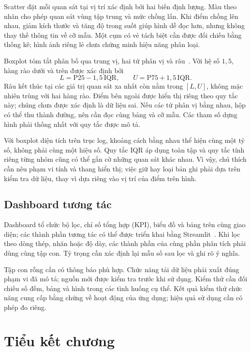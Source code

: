 \documentclass[12pt,a4paper,oneside]{report}
\begin{document}
Scatter đặt mỗi quan sát tại vị trí xác định bởi hai biến định lượng. Màu theo nhãn cho phép quan sát vùng tập trung và mức chồng lấn. Khi điểm chồng lên nhau, giảm kích thước và tăng độ trong suốt giúp hình dễ đọc hơn, nhưng không thay thế thông tin về cỡ mẫu. Một cụm có vẻ tách biệt cần được đối chiếu bằng thống kê; hình ảnh riêng lẻ chưa chứng minh hiệu năng phân loại.

Boxplot tóm tắt phân bố qua trung vị, hai tứ phân vị và râu~\cite{nistbox}. Với hệ số $1{,}5$, hàng rào dưới và trên được xác định bởi
\begin{equation}
  L=\mathrm{P25}-1{,}5\,\mathrm{IQR},
  \qquad
  U=\mathrm{P75}+1{,}5\,\mathrm{IQR}.
  \label{eq:hangraoiqr}
\end{equation}
Râu kết thúc tại các giá trị quan sát xa nhất còn nằm trong $[L,U]$, không mặc nhiên trùng với hai hàng rào. Điểm bên ngoài được hiển thị riêng theo quy tắc này; chúng chưa được xác định là dữ liệu sai. Nếu các tứ phân vị bằng nhau, hộp có thể thu thành đường, nên cần đọc cùng bảng và cỡ mẫu. Các tham số dựng hình phải thống nhất với quy tắc được mô tả.

Với boxplot diện tích trên trục log, khoảng cách bằng nhau thể hiện cùng một tỷ số, không phải cùng một hiệu số. Quy tắc IQR áp dụng toàn tập và quy tắc tính riêng từng nhóm cũng có thể gắn cờ những quan sát khác nhau. Vì vậy, chú thích cần nêu phạm vi tính và thang hiển thị; việc giữ hay loại bản ghi phải dựa trên kiểm tra dữ liệu, thay vì dựa riêng vào vị trí của điểm trên hình.

\subsection{Dashboard tương tác}

Dashboard tổ chức bộ lọc, chỉ số tổng hợp (KPI), biểu đồ và bảng trên cùng giao diện; các thành phần tương tác có thể được triển khai bằng Streamlit~\cite{streamlit}. Khi lọc theo dòng thép, nhãn hoặc độ dày, các thành phần của cùng phần phân tích phải dùng cùng tập con. Tỷ trọng cần xác định lại mẫu số sau lọc và ghi rõ ý nghĩa.

Tập con rỗng cần có thông báo phù hợp. Chức năng tải dữ liệu phải xuất đúng phạm vi đã mô tả; nguồn mới được kiểm tra trước khi sử dụng. Kiểm thử cần đối chiếu số đếm, bảng và hình trong các tình huống cụ thể. Kết quả kiểm thử chức năng cung cấp bằng chứng về hoạt động của ứng dụng; hiệu quả sử dụng cần có phép đo riêng.

\section{Tiểu kết chương}
\end{document}
